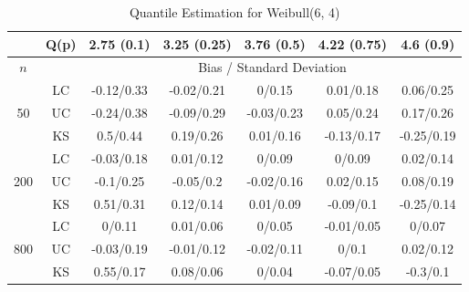 \documentclass[12pt]{article}
\numberwithin{equation}{section}
\begin{document}
\begin{table}[H]

\begin{center}
\caption{Quantile Estimation for Weibull(6, 4)}

\begin{tabular} {| c | c | c | c | c | c | c | } 

	 \hline
		&Q(p)&	2.75 (0.1)&	3.25 (0.25)&	3.76 (0.5)&	4.22 (0.75)&	4.6 (0.9)\\ 
 \hline 
 	$n$ & & \multicolumn{5}{|c|}{Bias / Standard Deviation} 
 \\ 
 \hline 
\multirow{3}{*}{50}		&	LC	&-0.12/0.33	&-0.02/0.21	&0/0.15	&0.01/0.18	&0.06/0.25\\ 
			&	UC	&-0.24/0.38	&-0.09/0.29	&-0.03/0.23	&0.05/0.24	&0.17/0.26\\ 
			&	KS	&0.5/0.44	&0.19/0.26	&0.01/0.16	&-0.13/0.17	&-0.25/0.19\\ 
	\hline 
\multirow{3}{*}{200}		&	LC	&-0.03/0.18	&0.01/0.12	&0/0.09	&0/0.09	&0.02/0.14\\ 
			&	UC	&-0.1/0.25	&-0.05/0.2	&-0.02/0.16	&0.02/0.15	&0.08/0.19\\ 
			&	KS	&0.51/0.31	&0.12/0.14	&0.01/0.09	&-0.09/0.1	&-0.25/0.14\\ 
	\hline 
\multirow{3}{*}{800}		&	LC	&0/0.11	&0.01/0.06	&0/0.05	&-0.01/0.05	&0/0.07\\ 
			&	UC	&-0.03/0.19	&-0.01/0.12	&-0.02/0.11	&0/0.1	&0.02/0.12\\ 
			&	KS	&0.55/0.17	&0.08/0.06	&0/0.04	&-0.07/0.05	&-0.3/0.1\\ 
	\hline 

\end{tabular}
\end{center}
\end{table}
\end{document}
